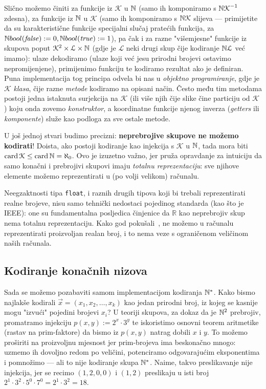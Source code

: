 Slično možemo činiti za funkcije iz $\mathcal K$ u ${\mathbb N}$ (samo ih komponiramo s ${{\mathbb N}\mathcal K}^{-1}$ zdesna), za funkcije iz ${\mathbb N}$ u $\mathcal K$ (samo ih komponiramo s ${{\mathbb N}\mathcal K}$ slijeva --- primijetite da su karakteristične funkcije specijalni slučaj pratećih funkcija, za ${\mathbb N} bool(\mathit{false}):=0,{\mathbb N} bool(\mathit{true}):=1$), pa čak i za razne "višemjesne" funkcije iz skupova poput $\mathcal K^2\times \mathcal L\times{\mathbb N}$ (gdje je $\mathcal L$ neki drugi skup čije kodiranje ${\mathbb N}\mathcal L$ već imamo): ulaze dekodiramo (ulaze koji već jesu prirodni brojevi ostavimo nepromijenjene), primijenimo funkciju te kodiramo rezultat ako je definiran. Puna implementacija tog principa odvela bi nas u \emph{objektno programiranje}, gdje je $\mathcal K$ \emph{klasa}, čije razne \emph{metode} kodiramo na opisani način. Često među tim metodama postoji jedna istaknuta surjekcija na $\mathcal K$ (ili više njih čije slike čine particiju od $\mathcal K$) koju onda zovemo \emph{konstruktor}, a koordinatne funkcije njenog inverza (\emph{getters} ili \emph{komponente}) služe kao podloga za sve ostale metode.

\begin{napomena}[{name=[ne možemo kodirati neprebrojive skupove]}]
U još jednoj stvari budimo precizni: \textbf{neprebrojive skupove ne možemo kodirati}! Doista, ako postoji kodiranje kao injekcija s $\mathcal K$ u ${\mathbb N}$, tada mora biti $\operatorname{card}\mathcal K\le\operatorname{card}{\mathbb N}=\aleph_0$. Ovo je izuzetno važno, jer pruža opravdanje za intuiciju da samo konačni i prebrojivi skupovi imaju \emph{totalnu reprezentaciju}: sve njihove elemente možemo reprezentirati u (po volji velikom) računalu. 

Neegzaktnosti tipa \texttt{float}, i raznih drugih tipova koji bi trebali reprezentirati realne brojeve, nisu samo tehnički nedostaci pojedinog standarda (kao što je IEEE): one su fundamentalna posljedica činjenice da $\mathbb R$ kao neprebrojiv skup nema totalnu reprezentaciju. Kako god pokušali~\cite{url:calc}, ne možemo u računalu reprezentirati proizvoljan realan broj, i to nema veze s ograničenom veličinom naših računala.
\end{napomena}

\subsection{Kodiranje konačnih nizova}
Sada se možemo pozabaviti samom implementacijom kodiranja ${\mathbb N}^*$. Kako bismo najlakše kodirali $\vec x=(x_1,x_2,\dotsc,x_k)$ kao jedan prirodni broj, iz kojeg se kasnije mogu "izvući" pojedini brojevi $x_i$? U teoriji skupova, za dokaz da je ${\mathbb N}^2$ prebrojiv, promatramo injekciju $p(x,y):=2^x\cdot3^y$ te iskoristimo osnovni teorem aritmetike (rastav na prim-faktore) da bismo iz $p(x,y)$ natrag dobili $x$ i $y$. To možemo proširiti na proizvoljnu mjesnost jer prim-brojeva ima beskonačno mnogo: uzmemo ih dovoljno redom po veličini, potenciramo odgovarajućim eksponentima i pomnožimo --- ali to nije kodiranje skupa ${\mathbb N}^*$. Naime, takvo preslikavanje nije injekcija, jer se recimo $(1,2,0,0)$ i $(1,2)$ preslikaju u isti broj $2^1\cdot3^2\cdot5^0\cdot7^0=2^1\cdot3^2=18$.

